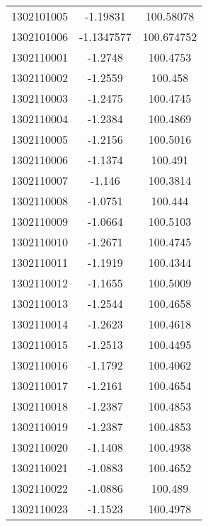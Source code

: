 \begin{longtable}[h]{lcc}
		1302101005 & -1.19831 & 100.58078\\ 
		1302101006 & -1.1347577 & 100.674752\\ 
		1302110001 & -1.2748 & 100.4753\\ 
		1302110002 & -1.2559 & 100.458\\ 
		1302110003 & -1.2475 & 100.4745\\ 
		1302110004 & -1.2384 & 100.4869\\ 
		1302110005 & -1.2156 & 100.5016\\ 
		1302110006 & -1.1374 & 100.491\\ 
		1302110007 & -1.146 & 100.3814\\ 
		1302110008 & -1.0751 & 100.444\\ 
		1302110009 & -1.0664 & 100.5103\\ 
		1302110010 & -1.2671 & 100.4745\\ 
		1302110011 & -1.1919 & 100.4344\\ 
		1302110012 & -1.1655 & 100.5009\\ 
		1302110013 & -1.2544 & 100.4658\\ 
		1302110014 & -1.2623 & 100.4618\\ 
		1302110015 & -1.2513 & 100.4495\\ 
		1302110016 & -1.1792 & 100.4062\\ 
		1302110017 & -1.2161 & 100.4654\\ 
		1302110018 & -1.2387 & 100.4853\\ 
		1302110019 & -1.2387 & 100.4853\\ 
		1302110020 & -1.1408 & 100.4938\\ 
		1302110021 & -1.0883 & 100.4652\\ 
		1302110022 & -1.0886 & 100.489\\ 
		1302110023 & -1.1523 & 100.4978\\
\end{longtable}